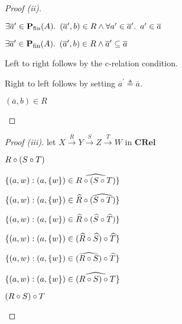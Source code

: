 \begin{prop}
\begin{proof}[Proof (ii)]
\begin{itemize}
      \step[\iffs]
        $\exists\overline{a}^\prime\in\mathbf{P}_{\operatorname{fin}}(A)\ldotp~(\overline{a}^\prime,b)\in R\land\forall a^\prime\in\overline{a}^\prime\ldotp~a^\prime\in\overline{a}$

      \step[\iffs]
        $\exists\overline{a}^\prime\in\mathbf{P}_{\operatorname{fin}}(A)\ldotp~(\overline{a}^\prime,b)\in R\land\overline{a}^\prime\subseteq\overline{a}$

      \step
        Left to right follows by the c-relation condition.

      \step
        Right to left follows by setting $\overline{a}^\prime\triangleq\overline{a}$.

      \step[\iffs]
        $(\overline{a}, b)\in R$\qedhere
    \end{itemize}
  \end{proof}

  \begin{proof}[Proof (iii)]
    let $X\overset{R}\longrightarrow Y\overset{S}\longrightarrow Z\overset{T}\longrightarrow W$ in $\mathbf{CRel}$

    \begin{itemize}
      \step
        $R\circ(S\circ T)$

      \step[=]
        $\{(a,w):(a,\{w\})\in\widehat{R\circ(S\circ T)}\}$
        \marginnote{\Thm-\ref{prop:rel-rel-hat}}

      \step[=]
        $\{(a,w):(a,\{w\})\in\widehat{R}\circ(\widehat{S\circ T})\}$
        \marginnote{\Thm-\ref{prop:rel-hat-comp}}

      \step[=]
        $\{(a,w):(a,\{w\})\in\widehat{R}\circ(\widehat{S}\circ\widehat{T})\}$
        \marginnote{\Thm-\ref{prop:rel-hat-comp}}

      \step[=]
        $\{(a,w):(a,\{w\})\in(\widehat{R}\circ\widehat{S})\circ\widehat{T}\}$

      \step[=]
        $\{(a,w):(a,\{w\})\in(\widehat{R\circ S})\circ\widehat{T}\}$
        \marginnote{\Thm-\ref{prop:rel-hat-comp}}

      \step[=]
        $\{(a,w):(a,\{w\})\in\widehat{(R\circ S)\circ T}\}$
        \marginnote{\Thm-\ref{prop:rel-hat-comp}}

      \step[=]
        $(R\circ S)\circ T$
        \qedhere
        \marginnote{\Thm-\ref{prop:rel-rel-hat}}
    \end{itemize}
  \end{proof}
\end{prop}

